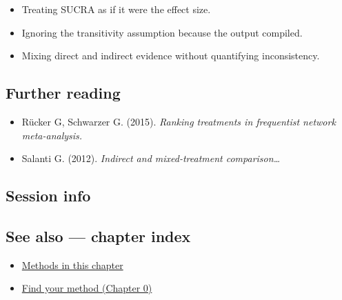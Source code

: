 \documentclass[
]{article}
\newenvironment{Shaded}{\begin{snugshade}}{\end{snugshade}}
\providecommand{\tightlist}{%
  \setlength{\itemsep}{0pt}\setlength{\parskip}{0pt}}
\begin{document}
\begin{itemize}
\tightlist
\item
  Treating SUCRA as if it were the effect size.
\item
  Ignoring the transitivity assumption because the output compiled.
\item
  Mixing direct and indirect evidence without quantifying inconsistency.
\end{itemize}

\subsection{Further reading}\label{further-reading}

\begin{itemize}
\tightlist
\item
  Rücker G, Schwarzer G. (2015). \emph{Ranking treatments in frequentist
  network meta-analysis.}
\item
  Salanti G. (2012). \emph{Indirect and mixed-treatment
  comparison\ldots{}}
\end{itemize}

\subsection{Session info}\label{session-info}

\begin{Shaded}
\begin{Highlighting}[]

\end{Highlighting}
\end{Shaded}

\subsection{See also --- chapter index}\label{see-also-chapter-index}

\begin{itemize}
\tightlist
\item
  \href{../index.Rmd}{Methods in this chapter}
\item
  \href{../../../ch00-find-your-method.Rmd}{Find your method (Chapter
  0)}
\end{itemize}
\end{document}
